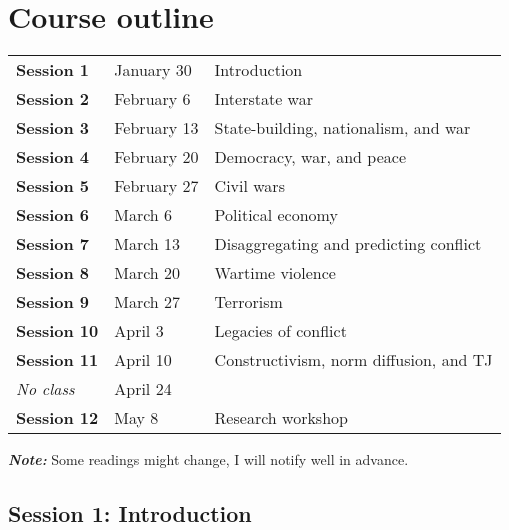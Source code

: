 \documentclass[12pt, a4paper]{article}
\begin{document}
\newpage
\section{Course outline}


\begin{table*}[!ht]
  \centering

  \begin{tabular}{lll}
    \textbf{Session 1} & January 30 & Introduction \\
    \textbf{Session 2} & February 6 & Interstate war \\
    \textbf{Session 3} & February 13 & State-building, nationalism, and war \\
    \textbf{Session 4} & February 20 & Democracy, war, and peace \\
    \textbf{Session 5} & February 27 & Civil wars \\
    \textbf{Session 6} & March 6 & Political economy \\
    \textbf{Session 7} & March 13 & Disaggregating and predicting conflict \\
    \textbf{Session 8} & March 20 & Wartime violence \\
    \textbf{Session 9} & March 27 & Terrorism \\
    \textbf{Session 10} & April 3 & Legacies of conflict \\
    \textbf{Session 11} & April 10 & Constructivism, norm diffusion, and TJ \\
    \textit{No class} & April 24 & \\
    \textbf{Session 12} & May 8 & Research workshop \\
  \end{tabular}
\end{table*}


\vspace{20pt}\noindent\textit{\textbf{Note:}} Some readings might change, I will notify well in advance.

\subsection*{Session 1: Introduction}
\end{document}
